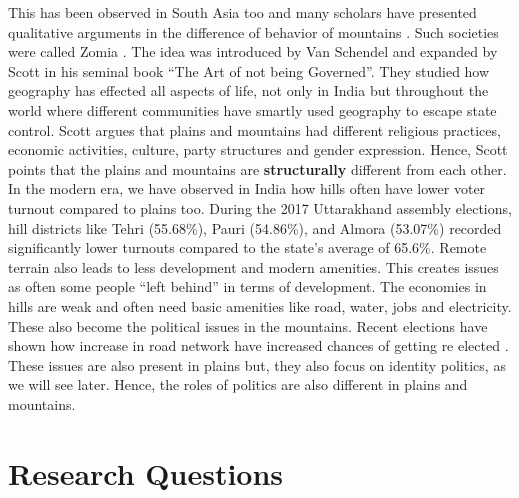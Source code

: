 \begin{sloppypar}
This has been observed in South Asia too and many scholars have presented qualitative arguments in the difference of behavior of mountains \citep{ali2019delusional,murton2013himalayan,alam2008becoming,hussain2015remoteness}. Such societies were called Zomia \citep{van2005geographies}. The idea was introduced by Van Schendel and expanded by Scott in his seminal book ``The Art of not being Governed''. They studied how geography has effected all aspects of life, not only in India but throughout the world where different communities have smartly used geography to escape state control. Scott argues that plains and mountains had different religious practices, economic activities, culture, party structures and gender expression. Hence, Scott points that the plains and mountains are \textbf{structurally} different from each other.  In the modern era, we have observed in India how hills often have lower voter turnout compared to plains too. During the 2017 Uttarakhand assembly elections, hill districts like Tehri (55.68\%), Pauri (54.86\%), and Almora (53.07\%) recorded significantly lower turnouts compared to the state's average of 65.6\%. Remote terrain also leads to less development and modern amenities. This creates issues as often some people ``left behind'' in terms of development. The economies in hills are weak and often need basic amenities like road, water, jobs and electricity. These also become the political issues in the mountains. Recent elections have shown how increase in road network have increased chances of getting re elected \citep{basistha2024elections}. These issues are also present in plains but, they also focus on identity politics, as we will see later. Hence, the roles of politics are also different in plains and mountains.



\section{Research Questions}


\end{sloppypar}
